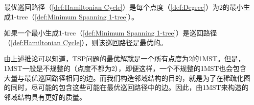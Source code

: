 \begin{corollary}
    \label{cor:Optimal Tour1}
    最优巡回路径（\autoref{def:Hamiltonian Cycle}）是每个点度（\autoref{def:Degree}）为2的最小生成1-tree（\autoref{def:Minimum Spanning 1-tree}）。
\end{corollary}
\begin{corollary}
    \label{cor:Optimal Tour2}
    如果一个最小生成1-tree（\autoref{def:Minimum Spanning 1-tree}）是巡回路径（\autoref{def:Hamiltonian Cycle}），则该巡回路径是最优的。
\end{corollary}
\par
由上述推论可以知道，TSP问题的最优解就是一个所有点度为2的1MST。但是，1MST一般是不规整的（点度不都为2），即便这样，一个不规整的1MST也会包含大量与最优巡回路径相同的边。而我们构造邻域结构的目的，就是为了在稀疏化图的同时，尽可能的包含这些可能在最优巡回路径中的边。因此，由1MST来构造的邻域结构具有更好的质量。


